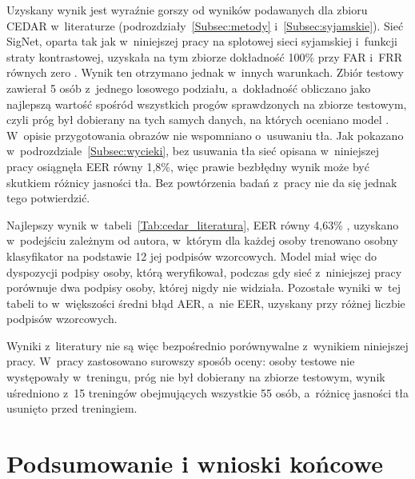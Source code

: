 \documentclass[12pt, twoside, openright]{article}
\begin{document}
Uzyskany wynik jest wyraźnie gorszy od wyników podawanych dla zbioru CEDAR w~literaturze (podrozdziały~\ref{Subsec:metody} i~\ref{Subsec:syjamskie}).
Sieć SigNet, oparta tak jak w~niniejszej pracy na splotowej sieci syjamskiej i~funkcji straty kontrastowej, uzyskała na tym zbiorze dokładność 100\% przy FAR i~FRR równych zero \cite{dey2017}.
Wynik ten otrzymano jednak w~innych warunkach.
Zbiór testowy zawierał 5 osób z~jednego losowego podziału, a~dokładność obliczano jako najlepszą wartość spośród wszystkich progów sprawdzonych na zbiorze testowym, czyli próg był dobierany na tych samych danych, na których oceniano model \cite{dey2017}.
W~opisie przygotowania obrazów nie wspomniano o~usuwaniu tła.
Jak pokazano w~podrozdziale~\ref{Subsec:wycieki}, bez usuwania tła sieć opisana w~niniejszej pracy osiągnęła EER równy 1,8\%, więc prawie bezbłędny wynik może być skutkiem różnicy jasności tła.
Bez powtórzenia badań z~pracy \cite{dey2017} nie da się jednak tego potwierdzić.

Najlepszy wynik w~tabeli~\ref{Tab:cedar_literatura}, EER równy 4,63\% \cite{hafemann2017features}, uzyskano w~podejściu zależnym od autora, w~którym dla każdej osoby trenowano osobny klasyfikator na podstawie 12 jej podpisów wzorcowych.
Model miał więc do dyspozycji podpisy osoby, którą weryfikował, podczas gdy sieć z~niniejszej pracy porównuje dwa podpisy osoby, której nigdy nie widziała.
Pozostałe wyniki w~tej tabeli to w~większości średni błąd AER, a~nie EER, uzyskany przy różnej liczbie podpisów wzorcowych.

Wyniki z~literatury nie są więc bezpośrednio porównywalne z~wynikiem niniejszej pracy.
W~pracy zastosowano surowszy sposób oceny: osoby testowe nie występowały w~treningu, próg nie był dobierany na zbiorze testowym, wynik uśredniono z~15 treningów obejmujących wszystkie 55 osób, a~różnicę jasności tła usunięto przed treningiem.


\section{Podsumowanie i wnioski końcowe}
\label{Sec:podsumowanie}



\end{document}
